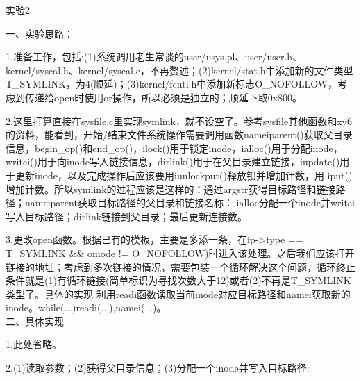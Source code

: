 \documentclass[12pt]{article}
\begin{document}
\newpage
\begin{large}
    \noindent 实验2\\
\end{large}
一、实验思路：\par
1.准备工作，包括:(1)系统调用老生常谈的user/usys.pl、user/user.h、kernel/syscal.h、kernel/syscal.c，不再赘述；(2)kernel/stat.h中添加新的文件类型T\_SYMLINK，为4(顺延)；(3)kernel/fcntl.h中添加新标志O\_NOFOLLOW，考虑到传递给open时使用or操作，所以必须是独立的；顺延下取0x800。\par
2.这里打算直接在sysfile.c里实现symlink，就不设空了。参考sysfile其他函数和xv6的资料，能看到，开始/结束文件系统操作需要调用函数nameiparent()获取父目录信息，begin\_op()和end\_op()，ilock()用于锁定inode，ialloc()用于分配inode，writei()用于向inode写入链接信息，dirlink()用于在父目录建立链接，iupdate()用于更新inode，以及完成操作后应该要用iunlockput()释放锁并增加计数，用
iput()增加计数。所以symlink的过程应该是这样的：通过argstr获得目标路径和链接路径；nameiparent获取目标路径的父目录和链接名称： ialloc分配一个inode并writei写入目标路径；dirlink链接到父目录；最后更新连接数。\par
3.更改open函数。根据已有的模板，主要是多添一条，在ip->type == T\_SYMLINK \&\& omode != O\_NOFOLLOW)时进入该处理。之后我们应该打开链接的地址；考虑到多次链接的情况，需要包装一个循环解决这个问题，循环终止条件就是(1)有循环链接(简单标识为寻找次数大于12)或者(2)不再是T\_SYMLINK类型了。具体的实现
利用readi函数读取当前inode对应目标路径和namei获取新的inode。while(...){readi(...),namei(...)}。\\
二、具体实现\par
1.此处省略。\par
2.(1)读取参数；(2)获得父目录信息；(3)分配一个inode并写入目标路径:
\begin{figure}[!h]
    \centering
    \hfill
\end{figure}\par
\end{document}
